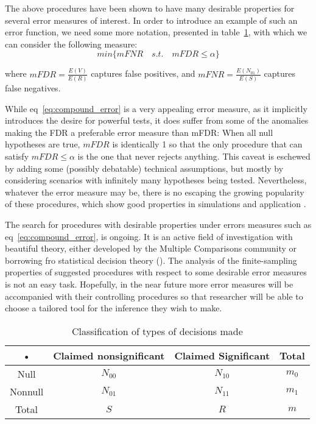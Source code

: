 \documentclass[draft,12pt]{article}
\begin{document}
The above procedures have been shown to have many desirable properties for several error measures of interest. In order to introduce an example of such an error function, we need some more notation, presented in table~\ref{tab:event_notation}, with which we can consider the following measure:
\begin{equation} \label{eq:compound_error}
min\{mFNR \quad s.t. \quad mFDR\leq \alpha \}
\end{equation}

where $mFDR=\frac{E(V)}{E(R)}$ captures false positives, and 
$mFNR=\frac{E(N_{01})}{E(S)}$ captures false negatives.

While eq~\ref{eq:compound_error} is a very appealing error measure, as it implicitly introduces the desire for powerful tests, it does suffer from some of the anomalies making the FDR a preferable error measure than mFDR: When all null hypotheses are true, $mFDR$ is identically 1 so that the only procedure that can satisfy $mFDR\leq \alpha$ is the one that never rejects anything. This caveat is eschewed by adding some (possibly debatable) technical assumptions, but mostly by considering scenarios with infinitely many hypotheses being tested. Nevertheless, whatever the error measure may be, there is no escaping the growing popularity of these procedures, which show good properties in simulations and application \cite{efron_microarrays_2008}.

The search for procedures with desirable properties under errors measures such as eq~\ref{eq:compound_error}, is ongoing. It is an active field of investigation with beautiful theory, either developed by the Multiple Comparisons community or borrowing fro statistical decision theory (\cite[see]{sun_oracle_2007}). The analysis of the finite-sampling properties of suggested procedures with respect to some desirable error measures is not an easy task. Hopefully, in the near future more error measures will be accompanied with their controlling procedures so that researcher will be able to choose a tailored tool for the inference they wish to make.


\begin{table}
  \centering
\begin{tabular}{|c|c|c|c|}
\hline \rule[-1ex]{0pt}{1.5ex} • & Claimed nonsignificant & Claimed Significant & Total \\ 
\hline
\hline \rule[-1ex]{0pt}{1.5ex} Null & $N_{00}$ & $N_{10}$ & $m_0$ \\ 
\hline \rule[-1ex]{0pt}{1.5ex} Nonnull & $N_{01}$ & $N_{11}$ & $m_1$ \\ 
\hline \rule[-1ex]{0pt}{1.5ex} Total & $S$ & $R$ & $m$ \\ 
\hline 
\end{tabular} 
  \caption{Classification of types of decisions made}
  \label{tab:event_notation}
\end{table}
\end{document}

